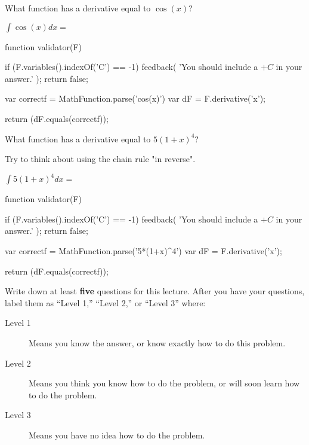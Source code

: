 \documentclass{ximera}
\begin{document}
\begin{question}
	\begin{hint}
		What function has a derivative equal to $\cos(x)$?
	\end{hint}
 	$\displaystyle \int \cos(x) dx = $ 
	\begin{expression-answer}
 function validator(F) {
   if (F.variables().indexOf('C') == -1) {
     feedback( 'You should include a $+C$ in your answer.' );
     return false;
   }
   
   var correctf = MathFunction.parse('cos(x)')
   var dF = F.derivative('x');
   
   return (dF.equals(correctf));
 }
\end{expression-answer}	
	
\end{question}

\begin{question}
	\begin{hint}
		What function has a derivative equal to $5(1+x)^4$?
	\end{hint}
	\begin{hint}
		Try to think about using the chain rule "in reverse".
	\end{hint}
 	$\displaystyle \int 5(1+x)^4 dx = $ 
	\begin{expression-answer}
 function validator(F) {
   if (F.variables().indexOf('C') == -1) {
     feedback( 'You should include a $+C$ in your answer.' );
     return false;
   }
   
   var correctf = MathFunction.parse('5*(1+x)^4')
   var dF = F.derivative('x');
   
   return (dF.equals(correctf));
 }
\end{expression-answer}	
	
\end{question}


\begin{question}
Write down at least \textbf{five} questions for this lecture. After
you have your questions, label them as ``Level 1,'' ``Level 2,'' or ``Level 3'' where:
\begin{description}
\item[Level 1] Means you know the answer, or know exactly how to do this problem.
\item[Level 2] Means you think you know how to do the problem, or will soon learn how to do the problem.
\item[Level 3] Means you have no idea how to do the problem. 
\end{description}
\begin{freeResponse}
\end{freeResponse}
\end{question}
\end{document}
